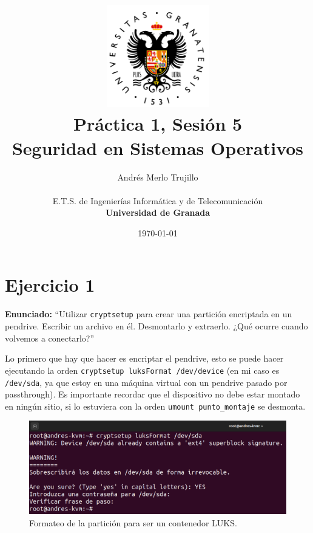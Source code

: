 \documentclass{article}
\title{
\includegraphics[width=1.75in]{imagenes/UGR-Logo.png} \\
\vspace*{1in}
\textbf{Práctica 1, Sesión 5} \\
Seguridad en Sistemas Operativos \\
\vspace*{0.5in}}
\author{Andrés Merlo Trujillo \\
\vspace*{0.5in} \\
E.T.S. de Ingenierías Informática y de Telecomunicación \\
\textbf{Universidad de Granada}} \date{\today}
\begin{document}
\begin{titlingpage}
    \maketitle
\end{titlingpage}

\tableofcontents

\newpage

\pagestyle{fancy}

{}
\section*{Ejercicio 1}

\textbf{Enunciado: }``Utilizar \texttt{cryptsetup} para crear una partición encriptada en un pendrive. Escribir un archivo en él. Desmontarlo y extraerlo. ¿Qué ocurre cuando volvemos a conectarlo?''

\bigskip

Lo primero que hay que hacer es encriptar el pendrive, esto se puede hacer ejecutando la orden \verb|cryptsetup luksFormat /dev/device| (en mi caso es \verb|/dev/sda|, ya que estoy en una máquina virtual con un pendrive pasado por passthrough). Es importante recordar que el dispositivo no debe estar montado en ningún sitio, si lo estuviera con la orden \verb|umount punto_montaje| se desmonta.

\begin{figure}[H]
    \includegraphics[width=\textwidth]{imagenes/Captura desde 2022-10-30 10-51-54.png}
    \caption{Formateo de la partición para ser un contenedor LUKS.}
\end{figure}
\end{document}
